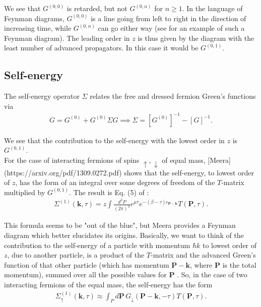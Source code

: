 \documentclass{article}
\theoremstyle{definition}
\begin{document}
\noindent We see that $G^{(0,0)}$ is retarded, but not $G^{(0,n)}$ for $n\geq 1$. In the language of Feynman diagrams, $G^{(0,0)}$ is a  line going from left to right in the direction of increasing time, while $G^{(0,n)}$ can go either way (see \cite{barth2014pairing} for an example of such a Feynman diagram). The leading order in $z$ is thus given by the diagram with the least number of advanced propagators. In this case it would be $G^{(0,1)}$.\\


\subsection{Self-energy}

\noindent The self-energy operator $\Sigma$ relates the free and dressed fermion Green's functions via 
\begin{align}
G = G^{(0)} + G^{(0)} \Sigma G \implies \Sigma = [G^{(0)}]^{-1} - [G]^{-1}.
\end{align}

\noindent We see that the contribution to the self-energy with the lowest order in $z$ is $G^{(0,1)}$. \\

\noindent For the case of interacting fermions of spins $\uparrow, \downarrow$ of equal mass, [Meera](https://arxiv.org/pdf/1309.0272.pdf) shows that the self-energy, to lowest order of $z$, has the form of an integral over some degrees of freedom of the $T$-matrix multiplied by $G^{(0,1)}$. The result is Eq. (5) of \cite{sun2015high}:
\begin{align}
\Sigma^{(1)}(\mathbf{k},\tau) = z \int \frac{d^3P}{(2\pi)^3} e^{\mu\tau} e^{-(\beta-\tau) \epsilon_\mathbf{P-k}} T(\mathbf{P},\tau).
\end{align}


\noindent This formula seems to be "out of the blue", but Meera \cite{ngampruetikorn2013pair} provides a Feynman diagram which better elucidates its origins. Basically, we want to think of the contribution to the self-energy of a particle with momentum $\hbar k$ to lowest order of $z$, due to another particle, is a product of the $T$-matrix and the advanced Green's function of that other particle (which has momentum $\mathbf{P} - \mathbf{k}$, where $\mathbf{P}$ is the total momentum), summed over all the possible values for $\mathbf{P}$ \cite{leyronas2011virial}. So, in the case of two interacting fermions of the equal mass, the self-energy has the form
\begin{align}
\Sigma^{(1)}_\uparrow(\mathbf{k}, \tau) \approx \int_P d\mathbf{P} \, G_\downarrow(\mathbf{P} - \mathbf{k},-\tau) T(\mathbf{P}, \tau).
\end{align}
\end{document}
